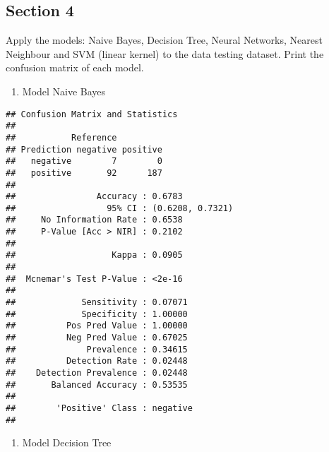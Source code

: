 \documentclass[]{article}
\newenvironment{Shaded}{\begin{snugshade}}{\end{snugshade}}
\newcommand{\DataTypeTok}[1]{\textcolor[rgb]{0.13,0.29,0.53}{#1}}
\newcommand{\KeywordTok}[1]{\textcolor[rgb]{0.13,0.29,0.53}{\textbf{#1}}}
\newcommand{\NormalTok}[1]{#1}
\newcommand{\OperatorTok}[1]{\textcolor[rgb]{0.81,0.36,0.00}{\textbf{#1}}}
\newcommand{\StringTok}[1]{\textcolor[rgb]{0.31,0.60,0.02}{#1}}
\providecommand{\tightlist}{%
  \setlength{\itemsep}{0pt}\setlength{\parskip}{0pt}}
\begin{document}
\hypertarget{section-4}{%
\subsection{Section 4}\label{section-4}}

Apply the models: Naive Bayes, Decision Tree, Neural Networks, Nearest
Neighbour and SVM (linear kernel) to the data testing dataset. Print the
confusion matrix of each model.

\begin{enumerate}
\def\labelenumi{\arabic{enumi}.}
\tightlist
\item
  Model Naive Bayes
\end{enumerate}

\begin{Shaded}
\end{Shaded}

\begin{verbatim}
## Confusion Matrix and Statistics
## 
##           Reference
## Prediction negative positive
##   negative        7        0
##   positive       92      187
##                                           
##                Accuracy : 0.6783          
##                  95% CI : (0.6208, 0.7321)
##     No Information Rate : 0.6538          
##     P-Value [Acc > NIR] : 0.2102          
##                                           
##                   Kappa : 0.0905          
##                                           
##  Mcnemar's Test P-Value : <2e-16          
##                                           
##             Sensitivity : 0.07071         
##             Specificity : 1.00000         
##          Pos Pred Value : 1.00000         
##          Neg Pred Value : 0.67025         
##              Prevalence : 0.34615         
##          Detection Rate : 0.02448         
##    Detection Prevalence : 0.02448         
##       Balanced Accuracy : 0.53535         
##                                           
##        'Positive' Class : negative        
## 
\end{verbatim}

\begin{enumerate}
\def\labelenumi{\arabic{enumi}.}
\setcounter{enumi}{1}
\tightlist
\item
  Model Decision Tree
\end{enumerate}
\end{document}
